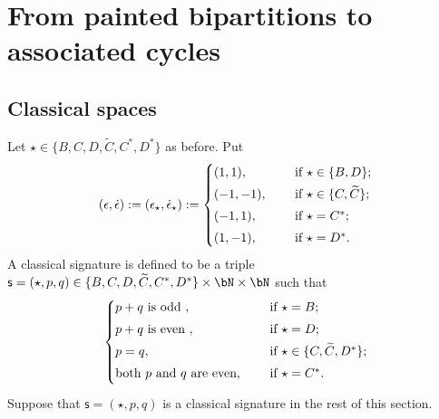 \documentclass[12pt,a4paper]{amsart}
\numberwithin{equation}{section}
\theoremstyle{remark}
\begin{document}
\section{From painted bipartitions to associated cycles} \label{sec:Nil}



\subsection{Classical spaces}
Let $\star\in \{B,C,D, \widetilde C, C^*, D^*\}$ as before. Put
\[
(\epsilon, \dot \epsilon):=(\epsilon_\star, \dot \epsilon_\star):=\begin{cases}
  (1,1),&\quad \textrm{ if  $\star\in \{B,D\}$;} \smallskip \\
 (-1,-1),&\quad \textrm{ if  $\star\in \{C,\widetilde C\}$;} \smallskip \\
 (-1,1),&\quad \textrm{ if  $\star=C^*$;} \smallskip \\
 (1,-1),&\quad \textrm{ if  $\star=D^*$.}
 \end{cases}
\]
A classical signature is defined to be a triple  $\mathsf s=(\star, p,q)\in  \{B,C,D, \widetilde C, C^*, D^*\}\times \bN\times \bN$ such that
\[
\begin{cases}
  p+q\textrm{ is odd },&\quad \textrm{ if  $\star=B$;} \smallskip \\
   p+q\textrm{ is even },&\quad \textrm{ if  $\star=D$;} \smallskip \\
 p=q,&\quad \textrm{ if  $\star\in \{C,\widetilde C, D^*\}$;} \smallskip \\
\textrm{both $p$ and $q$ are even} ,&\quad \textrm{ if  $\star=C^*$.} \smallskip \\
 \end{cases}
\]
 Suppose that $\mathsf s=(\star, p,q)$ is a classical  signature in the rest of this section.
\end{document}
